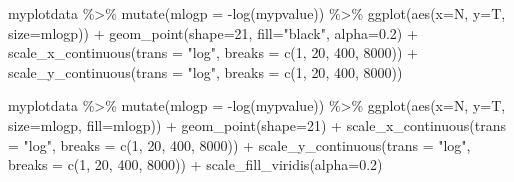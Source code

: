 \documentclass[
]{book}
\newenvironment{Shaded}{\begin{snugshade}}{\end{snugshade}}
\newcommand{\AttributeTok}[1]{\textcolor[rgb]{0.77,0.63,0.00}{#1}}
\newcommand{\DecValTok}[1]{\textcolor[rgb]{0.00,0.00,0.81}{#1}}
\newcommand{\FloatTok}[1]{\textcolor[rgb]{0.00,0.00,0.81}{#1}}
\newcommand{\FunctionTok}[1]{\textcolor[rgb]{0.00,0.00,0.00}{#1}}
\newcommand{\NormalTok}[1]{#1}
\newcommand{\SpecialCharTok}[1]{\textcolor[rgb]{0.00,0.00,0.00}{#1}}
\newcommand{\StringTok}[1]{\textcolor[rgb]{0.31,0.60,0.02}{#1}}
\begin{document}
\begin{Shaded}
\begin{Highlighting}[]
\NormalTok{myplotdata }\SpecialCharTok{\%\textgreater{}\%} 
  \FunctionTok{mutate}\NormalTok{(}\AttributeTok{mlogp =} \SpecialCharTok{{-}}\FunctionTok{log}\NormalTok{(mypvalue)) }\SpecialCharTok{\%\textgreater{}\%} 
  \FunctionTok{ggplot}\NormalTok{(}\FunctionTok{aes}\NormalTok{(}\AttributeTok{x=}\NormalTok{N, }\AttributeTok{y=}\NormalTok{T, }\AttributeTok{size=}\NormalTok{mlogp)) }\SpecialCharTok{+}
  \FunctionTok{geom\_point}\NormalTok{(}\AttributeTok{shape=}\DecValTok{21}\NormalTok{, }\AttributeTok{fill=}\StringTok{"black"}\NormalTok{, }\AttributeTok{alpha=}\FloatTok{0.2}\NormalTok{) }\SpecialCharTok{+}
  \FunctionTok{scale\_x\_continuous}\NormalTok{(}\AttributeTok{trans =} \StringTok{"log"}\NormalTok{, }\AttributeTok{breaks =} \FunctionTok{c}\NormalTok{(}\DecValTok{1}\NormalTok{, }\DecValTok{20}\NormalTok{, }\DecValTok{400}\NormalTok{, }\DecValTok{8000}\NormalTok{)) }\SpecialCharTok{+}
  \FunctionTok{scale\_y\_continuous}\NormalTok{(}\AttributeTok{trans =} \StringTok{"log"}\NormalTok{, }\AttributeTok{breaks =} \FunctionTok{c}\NormalTok{(}\DecValTok{1}\NormalTok{, }\DecValTok{20}\NormalTok{, }\DecValTok{400}\NormalTok{, }\DecValTok{8000}\NormalTok{))}



\NormalTok{myplotdata }\SpecialCharTok{\%\textgreater{}\%} 
  \FunctionTok{mutate}\NormalTok{(}\AttributeTok{mlogp =} \SpecialCharTok{{-}}\FunctionTok{log}\NormalTok{(mypvalue)) }\SpecialCharTok{\%\textgreater{}\%} 
  \FunctionTok{ggplot}\NormalTok{(}\FunctionTok{aes}\NormalTok{(}\AttributeTok{x=}\NormalTok{N, }\AttributeTok{y=}\NormalTok{T, }\AttributeTok{size=}\NormalTok{mlogp, }\AttributeTok{fill=}\NormalTok{mlogp)) }\SpecialCharTok{+}
  \FunctionTok{geom\_point}\NormalTok{(}\AttributeTok{shape=}\DecValTok{21}\NormalTok{) }\SpecialCharTok{+}
  \FunctionTok{scale\_x\_continuous}\NormalTok{(}\AttributeTok{trans =} \StringTok{"log"}\NormalTok{, }\AttributeTok{breaks =} \FunctionTok{c}\NormalTok{(}\DecValTok{1}\NormalTok{, }\DecValTok{20}\NormalTok{, }\DecValTok{400}\NormalTok{, }\DecValTok{8000}\NormalTok{)) }\SpecialCharTok{+}
  \FunctionTok{scale\_y\_continuous}\NormalTok{(}\AttributeTok{trans =} \StringTok{"log"}\NormalTok{, }\AttributeTok{breaks =} \FunctionTok{c}\NormalTok{(}\DecValTok{1}\NormalTok{, }\DecValTok{20}\NormalTok{, }\DecValTok{400}\NormalTok{, }\DecValTok{8000}\NormalTok{)) }\SpecialCharTok{+}
  \FunctionTok{scale\_fill\_viridis}\NormalTok{(}\AttributeTok{alpha=}\FloatTok{0.2}\NormalTok{)}
\end{Highlighting}
\end{Shaded}
\end{document}

